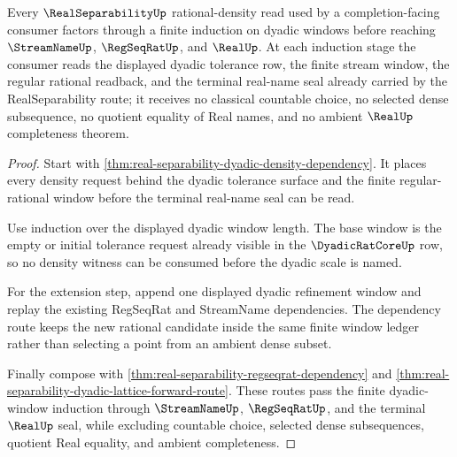 \begin{theorem}
\label{thm:real-separability-dyadic-density-induction}
Every $\RealSeparabilityUp$ rational-density read used by a completion-facing consumer factors through a finite induction on dyadic windows before reaching $\StreamNameUp$, $\RegSeqRatUp$, and $\RealUp$. At each induction stage the consumer reads the displayed dyadic tolerance row, the finite stream window, the regular rational readback, and the terminal real-name seal already carried by the RealSeparability route; it receives no classical countable choice, no selected dense subsequence, no quotient equality of Real names, and no ambient $\RealUp$ completeness theorem.
\end{theorem}
\begin{proof}
Start with \autoref{thm:real-separability-dyadic-density-dependency}. It places every density request behind the dyadic tolerance surface and the finite regular-rational window before the terminal real-name seal can be read.

Use induction over the displayed dyadic window length. The base window is the empty or initial tolerance request already visible in the $\DyadicRatCoreUp$ row, so no density witness can be consumed before the dyadic scale is named.

For the extension step, append one displayed dyadic refinement window and replay the existing RegSeqRat and StreamName dependencies. The dependency route keeps the new rational candidate inside the same finite window ledger rather than selecting a point from an ambient dense subset.

Finally compose with \autoref{thm:real-separability-regseqrat-dependency} and \autoref{thm:real-separability-dyadic-lattice-forward-route}. These routes pass the finite dyadic-window induction through $\StreamNameUp$, $\RegSeqRatUp$, and the terminal $\RealUp$ seal, while excluding countable choice, selected dense subsequences, quotient Real equality, and ambient completeness.
\end{proof}
